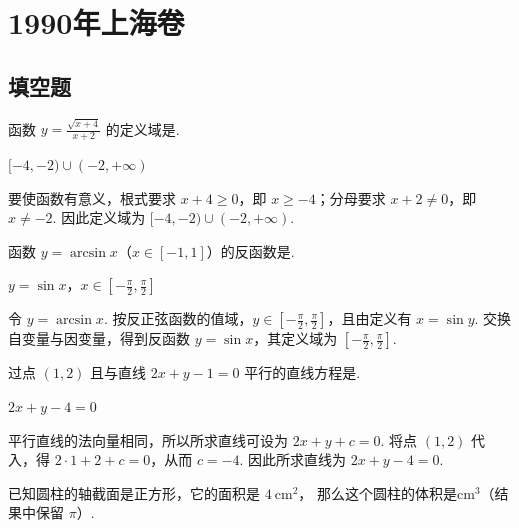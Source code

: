 \chapter{1990年上海卷}
\section{填空题}

\begin{problem}
函数 \(y=\frac{\sqrt{x+4}}{x+2}\) 的定义域是\fillinblank{}.
\end{problem}

\begin{answer}
\([-4,-2)\cup(-2,+\infty)\)
\end{answer}

\begin{solution}
要使函数有意义，根式要求 \(x+4\geq0\)，即 \(x\geq-4\)；分母要求 \(x+2\ne0\)，即 \(x\ne-2\). 因此定义域为 \([-4,-2)\cup(-2,+\infty)\).
\end{solution}

\begin{problem}
函数 \(y=\arcsin x\)（\(x\in[-1,1]\)）的反函数是\fillinblank{}.
\end{problem}

\begin{answer}
\(y=\sin x\)，\(x\in[-\frac{\pi}{2},\frac{\pi}{2}]\)
\end{answer}

\begin{solution}
令 \(y=\arcsin x\). 按反正弦函数的值域，\(y\in[-\frac{\pi}{2},\frac{\pi}{2}]\)，且由定义有 \(x=\sin y\). 交换自变量与因变量，得到反函数 \(y=\sin x\)，其定义域为 \([-\frac{\pi}{2},\frac{\pi}{2}]\).
\end{solution}

\begin{problem}
过点 \((1,2)\) 且与直线 \(2x+y-1=0\) 平行的直线方程是\fillinblank{}.
\end{problem}

\begin{answer}
\(2x+y-4=0\)
\end{answer}

\begin{solution}
平行直线的法向量相同，所以所求直线可设为 \(2x+y+c=0\). 将点 \((1,2)\) 代入，得 \(2\cdot1+2+c=0\)，从而 \(c=-4\). 因此所求直线为 \(2x+y-4=0\).
\end{solution}

\begin{problem}
已知圆柱的轴截面是正方形，它的面积是 \(4\mathrm{~cm}^2\)，
那么这个圆柱的体积是\fillinblank{}\(\mathrm{cm}^3\)（结果中保留 \(\pi\)）.
\end{problem}


